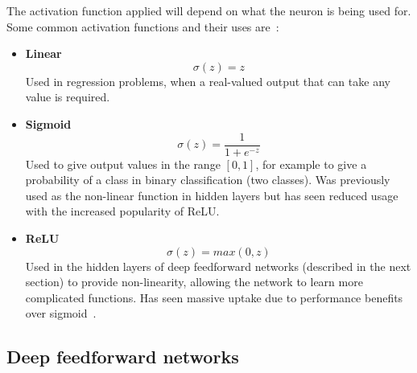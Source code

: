 \documentclass[12pt,a4paper,twoside,openright]{report}
\begin{document}
The activation function applied will depend on what the neuron is being used for.
Some common activation functions and their uses are~\cite{Art_Int}:
\begin{itemize}
  \item \textbf{Linear}
        \begin{equation}
          \sigma(z) = z
        \end{equation}
        Used in regression problems, when a real-valued output that can take any value is required.
  \item \textbf{Sigmoid}
        \begin{equation}
          \sigma(z) = \frac{1}{1 + e^{-z}}
        \end{equation}
        Used to give output values in the range $[0,1]$, for example to give a probability of a class in binary classification (two classes).
        Was previously used as the non-linear function in hidden layers but has seen reduced usage with the increased popularity of ReLU.
  \item \textbf{ReLU}
        \begin{equation}
          \sigma(z) = max(0, z)
          \label{eq:relu}
        \end{equation}
        Used in the hidden layers of deep feedforward networks (described in the next section) to provide non-linearity, allowing the network to learn more 
        complicated functions. Has seen massive uptake due to performance benefits over sigmoid~\cite{relu}.
\end{itemize}

\subsection{Deep feedforward networks}
\end{document}
